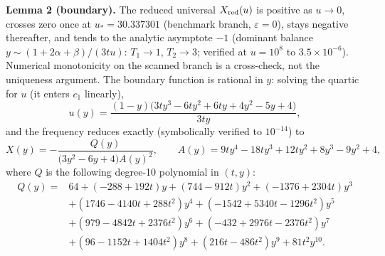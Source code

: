 \textbf{Lemma 2 (boundary).} The reduced universal $X_{\rm red}(u)$ is positive as $u\to0$, crosses zero once at $u_*=30.337301$ (benchmark branch, $\varepsilon=0$), stays negative thereafter, and tends to the analytic asymptote $-1$ (dominant balance $y\sim(1+2\alpha+\beta)/(3tu)$: $T_1\to1$, $T_2\to3$; verified at $u=10^8$ to $3.5\times10^{-6}$). Numerical monotonicity on the scanned branch is a cross-check, not the uniqueness argument. The boundary function is rational in $y$: solving the quartic for $u$ (it enters $c_1$ linearly),
\begin{equation*}
u(y)=\frac{(1-y)\bigl(3ty^3-6ty^2+6ty+4y^2-5y+4\bigr)}{3ty},
\end{equation*}
and the frequency reduces exactly (symbolically verified to $10^{-14}$) to
\begin{equation*}
X(y)=-\frac{Q(y)}{\bigl(3y^2-6y+4\bigr)A(y)^2},\qquad
A(y)=9ty^4-18ty^3+12ty^2+8y^3-9y^2+4,
\end{equation*}
where $Q$ is the following degree-10 polynomial in $(t,y)$:
\begin{equation*}
\begin{aligned}
Q(y)={}&64+(-288+192t)y+(744-912t)y^2+(-1376+2304t)y^3\\
&+(1746-4140t+288t^2)y^4+(-1542+5340t-1296t^2)y^5\\
&+(979-4842t+2376t^2)y^6+(-432+2976t-2376t^2)y^7\\
&+(96-1152t+1404t^2)y^8+(216t-486t^2)y^9+81t^2y^{10}.
\end{aligned}
\end{equation*}

